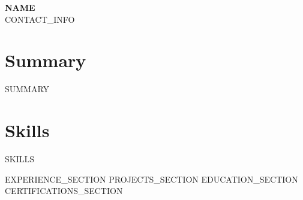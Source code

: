 \documentclass{resume}
\begin{document}
\begin{center}
    {\Huge \textbf{{{NAME}}}}\\[4pt]
    \small
    {{CONTACT_INFO}}
\end{center}

\section{Summary}
\begin{itemize}[leftmargin=0pt, itemindent=0pt, labelwidth=0pt, labelsep=0pt, align=left, label={}]%
  \small{\item{
    {{SUMMARY}}
  }}
\end{itemize}

\section{Skills}
\begin{itemize}[leftmargin=0pt, itemindent=0pt, labelwidth=0pt, labelsep=0pt, align=left, label={}]%
  \small{\item{
    {{SKILLS}}
  }}
\end{itemize}

{{EXPERIENCE_SECTION}}
{{PROJECTS_SECTION}}
{{EDUCATION_SECTION}}
{{CERTIFICATIONS_SECTION}}
\end{document}
